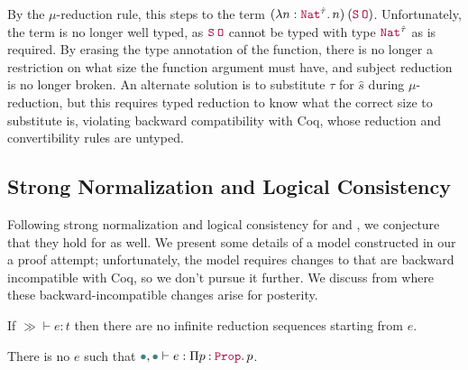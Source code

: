 By the $\mu$-reduction rule, this steps to the term $\app{(\abs{n}{\Nat^{\hat{\tau}}}{n})}{(\app{\Succ}{\Zero})}$.
Unfortunately, the term is no longer well typed, as $\app{\Succ}{\Zero}$ cannot be typed with type $\Nat^{\hat{\tau}}$ as is required.
By erasing the type annotation of the function,
there is no longer a restriction on what size the function argument must have,
and subject reduction is no longer broken.
An alternate solution is to substitute $\tau$ for $\hat{s}$ during $\mu$-reduction,
but this requires typed reduction to know what the correct size to substitute is,
violating backward compatibility with Coq,
whose reduction and convertibility rules are untyped.

\subsection{Strong Normalization and Logical Consistency}\label{sec:metatheory:sn}

Following strong normalization and logical consistency for \CIChatminus and \CChatomega,
we conjecture that they hold for \lang as well.
We present some details of a model constructed in our a proof attempt;
unfortunately, the model requires changes to \lang that are backward
incompatible with Coq, so we don't pursue it further.
We discuss from where these backward-incompatible changes arise for posterity.

\begin{conjecture}\label{thm:metatheory:sn}
  If $\gg \vdash e : t$ then there are no infinite reduction sequences starting from $e$.
\end{conjecture}

\begin{conjecture}\label{thm:metatheory:lc}
  There is no $e$ such that $\mt, \mt \vdash e : \prod{p}{\Prop}{p}$.
\end{conjecture}

\iffalse
Note that strong normalization is a stricter requirement than Coq, which is only \emph{weakly} normalizing:
every well-typed term has \emph{some} finite reduction sequence.
This relaxation enables more programs to pass the guard predicates while still being consistent.
For instance, the first fixpoint definition is accepted, as \texttt{x} is never used,
but the second is not.

\begin{verbatim}
Fixpoint f (u: unit): unit := let x := f u in tt.
Fail Fixpoint f (u: unit): False := let x := f u in x.
\end{verbatim}
\fi

